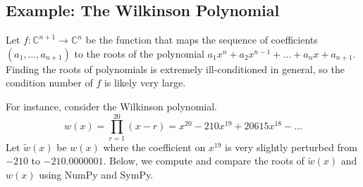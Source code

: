 %
%
%

\subsection*{Example: The Wilkinson Polynomial} %

Let $f:\mathbb{C}^{n+1} \rightarrow \mathbb{C}^n$ be the function that maps the sequence of coefficients $(a_1, \ldots, a_{n+1})$ to the roots of the polynomial $a_1x^n+a_2x^{n-1}+\ldots+a_nx+a_{n+1}$.
Finding the roots of polynomials is extremely ill-conditioned in general, so the condition number of $f$ is likely very large.

For instance, consider the Wilkinson polynomial.
\[
w(x) = \prod_{r=1}^{20}(x-r) = x^{20}-210x^{19}+20615x^{18}-\ldots
\]
Let $\tilde{w}(x)$ be $w(x)$ where the coefficient on $x^{19}$ is very slightly perturbed from $-210$ to $-210.0000001$.
Below, we compute and compare the roots of $\tilde{w}(x)$ and $w(x)$ using NumPy and SymPy.


